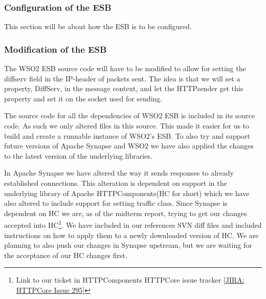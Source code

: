     \subsubsection{Configuration of the ESB}\label{Configuration of the ESB} 
    This section will be about how the ESB is to be configured.

    \subsubsection{Modification of the ESB}\label{Modification of the ESB} 
		The WSO2 ESB source code will have to be modified to allow for setting the diffserv field in the IP-header of packets sent. The idea is that we will set a property, DiffServ, in the message context, and let the HTTPsender get this property and set it on the socket used for sending.

The source code for all the dependencies of WSO2 ESB is included in its source code. As such we only altered files in this source. This made it easier for us to build and create a runnable instance of WSO2’s ESB. To also try and support future versions of Apache Synapse and WSO2 we have also applied the changes to the latest version of the underlying libraries.

In Apache Synapse we have altered the way it sends responses to already established connections. This alteration is dependent on support in the underlying library of Apache HTTPComponents(HC for short) which we have also altered to include support for setting traffic class. Since Synapse is dependent on HC we are, as of the midterm report, trying to get our changes accepted into HC\footnote{Link to our ticket in HTTPComponents HTTPCore issue tracker  [\href{https://issues.apache.org/jira/browse/HTTPCORE-295}{JIRA: HTTPCore Issue 295}]}. We have included in our references SVN diff files and included instructions on how to apply them to a newly downloaded version of HC. We are planning to also push our changes in Synapse upstream, but we are waiting for the acceptance of our HC changes first.
    
